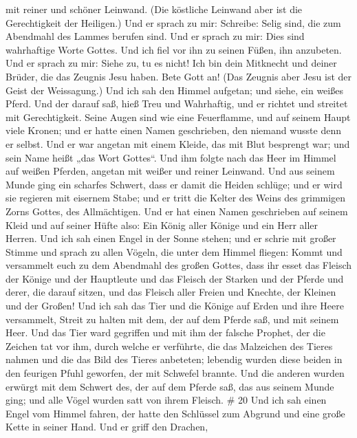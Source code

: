 mit reiner und schöner Leinwand. (Die köstliche Leinwand aber ist die
Gerechtigkeit der Heiligen.)  Und er sprach zu mir:
Schreibe: Selig sind, die zum Abendmahl des Lammes berufen sind. Und er
sprach zu mir: Dies sind wahrhaftige Worte Gottes.  Und ich
fiel vor ihn zu seinen Füßen, ihn anzubeten. Und er sprach zu mir: Siehe
zu, tu es nicht! Ich bin dein Mitknecht und deiner Brüder, die das
Zeugnis Jesu haben. Bete Gott an! (Das Zeugnis aber Jesu ist der Geist
der Weissagung.)  Und ich sah den Himmel aufgetan; und
siehe, ein weißes Pferd. Und der darauf saß, hieß Treu und Wahrhaftig,
und er richtet und streitet mit Gerechtigkeit.  Seine Augen
sind wie eine Feuerflamme, und auf seinem Haupt viele Kronen; und er
hatte einen Namen geschrieben, den niemand wusste denn er selbst.
 Und er war angetan mit einem Kleide, das mit Blut
besprengt war; und sein Name heißt „das Wort Gottes``.  Und
ihm folgte nach das Heer im Himmel auf weißen Pferden, angetan mit
weißer und reiner Leinwand.  Und aus seinem Munde ging ein
scharfes Schwert, dass er damit die Heiden schlüge; und er wird sie
regieren mit eisernem Stabe; und er tritt die Kelter des Weins des
grimmigen Zorns Gottes, des Allmächtigen.  Und er hat einen
Namen geschrieben auf seinem Kleid und auf seiner Hüfte also: Ein König
aller Könige und ein Herr aller Herren.  Und ich sah einen
Engel in der Sonne stehen; und er schrie mit großer Stimme und sprach zu
allen Vögeln, die unter dem Himmel fliegen: Kommt und versammelt euch zu
dem Abendmahl des großen Gottes,  dass ihr esset das
Fleisch der Könige und der Hauptleute und das Fleisch der Starken und
der Pferde und derer, die darauf sitzen, und das Fleisch aller Freien
und Knechte, der Kleinen und der Großen!  Und ich sah das
Tier und die Könige auf Erden und ihre Heere versammelt, Streit zu
halten mit dem, der auf dem Pferde saß, und mit seinem Heer.
 Und das Tier ward gegriffen und mit ihm der falsche
Prophet, der die Zeichen tat vor ihm, durch welche er verführte, die das
Malzeichen des Tieres nahmen und die das Bild des Tieres anbeteten;
lebendig wurden diese beiden in den feurigen Pfuhl geworfen, der mit
Schwefel brannte.  Und die anderen wurden erwürgt mit dem
Schwert des, der auf dem Pferde saß, das aus seinem Munde ging; und alle
Vögel wurden satt von ihrem Fleisch. \# 20  Und ich sah
einen Engel vom Himmel fahren, der hatte den Schlüssel zum Abgrund und
eine große Kette in seiner Hand.  Und er griff den Drachen,
